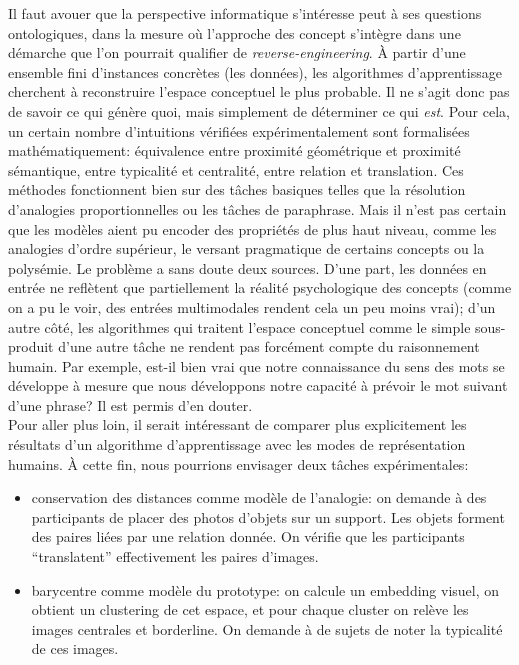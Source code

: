 \documentclass[french]{article}
\begin{document}
	Il faut avouer que la perspective informatique s'intéresse peut à ses questions ontologiques, dans la mesure où l'approche des concept s'intègre dans une démarche que l'on pourrait qualifier de \textit{reverse-engineering}. À partir d'une ensemble fini d'instances concrètes (les données), les algorithmes d'apprentissage cherchent à reconstruire l'espace conceptuel le plus probable. Il ne s'agit donc pas de savoir ce qui génère quoi, mais simplement de déterminer ce qui \textit{est}. Pour cela, un certain nombre d'intuitions vérifiées expérimentalement sont formalisées mathématiquement: équivalence entre proximité géométrique et proximité sémantique, entre typicalité et centralité, entre relation et translation. Ces méthodes fonctionnent bien sur des tâches basiques telles que la résolution d'analogies proportionnelles ou les tâches de paraphrase. Mais il n'est pas certain que les modèles aient pu encoder des propriétés de plus haut niveau, comme les analogies d'ordre supérieur, le versant pragmatique de certains concepts ou la polysémie. Le problème a sans doute deux sources. D'une part, les données en entrée ne reflètent que partiellement la réalité psychologique des concepts (comme on a pu le voir, des entrées multimodales rendent cela un peu moins vrai); d'un autre côté, les algorithmes qui traitent l'espace conceptuel comme le simple sous-produit d'une autre tâche ne rendent pas forcément compte du raisonnement humain. Par exemple, est-il bien vrai que notre connaissance du sens des mots se développe à mesure que nous développons notre capacité à prévoir le mot suivant d'une phrase? Il est permis d'en douter.\\
	
	Pour aller plus loin, il serait intéressant de comparer plus explicitement les résultats d'un algorithme d'apprentissage avec les modes de représentation humains. À cette fin, nous pourrions envisager deux tâches expérimentales:
	\begin{itemize}
		\item conservation des distances comme modèle de l'analogie:
		on demande à des participants de placer des photos d'objets sur un support. Les objets forment des paires liées par une relation donnée. On vérifie que les participants ``translatent'' effectivement les paires d'images.
		\item barycentre comme modèle du prototype: on calcule un embedding visuel, on obtient un clustering de cet espace, et pour chaque cluster on relève les images centrales et borderline. On demande à de sujets de noter la typicalité de ces images.
	\end{itemize}
\end{document}
